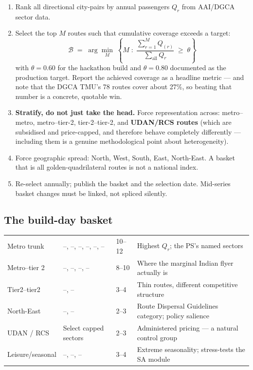 \begin{enumerate}
\item Rank all directional city-pairs by annual passengers $Q_r$ from AAI/DGCA sector data.
\item Select the top $M$ routes such that cumulative coverage exceeds a target:
\begin{equation}
\mathcal{B} \;=\; \arg\min_{M}\;\left\{ M \;:\; \frac{\sum_{r=1}^{M} Q_{(r)}}{\sum_{\text{all}} Q_r} \;\geq\; \theta \right\}
\end{equation}
with $\theta = 0.60$ for the hackathon build and $\theta = 0.80$ documented as the
production target. Report the achieved coverage as a headline metric --- and note that the
DGCA TMU's 78 routes cover about 27\%, so beating that number is a concrete, quotable win.
\item \textbf{Stratify, do not just take the head.} Force representation across:
metro--metro, metro--tier-2, tier-2--tier-2, and \textbf{UDAN/RCS routes} (which are
subsidised and price-capped, and therefore behave completely differently --- including them
is a genuine methodological point about heterogeneity).
\item Force geographic spread: North, West, South, East, North-East. A basket that is all
golden-quadrilateral routes is not a national index.
\item Re-select annually; publish the basket and the selection date. Mid-series basket
changes must be linked, not spliced silently.
\end{enumerate}

\subsection{The build-day basket}

\begin{center}
\footnotesize
\begin{tabularx}{\textwidth}{@{}L{2.4cm} L{3.4cm} L{2.6cm} X@{}}
\toprule
{} &  &  &  \\
\midrule
Metro trunk & --, --, --, --, --, -- & 10--12 & Highest $Q_r$; the PS's named sectors \\
Metro--tier 2 & --, --, --, -- & 8--10 & Where the marginal Indian flyer actually is \\
Tier2--tier2 & --, -- & 3--4 & Thin routes, different competitive structure \\
North-East & --, -- & 2--3 & Route Dispersal Guidelines category; policy salience \\
UDAN / RCS & Select capped sectors & 2--3 & Administered pricing --- a natural control group \\
Leisure/seasonal & --, --, -- & 3--4 & Extreme seasonality; stress-tests the SA module \\
\bottomrule
\end{tabularx}
\end{center}

